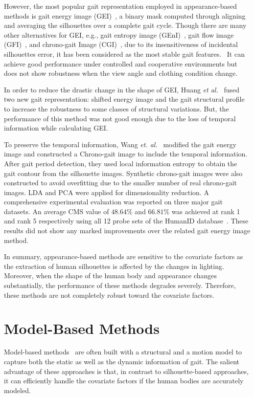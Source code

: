 However, the most popular gait representation employed in appearance-based methods is gait energy image (GEI)~\cite{Han_06}, a binary mask computed through aligning and averaging the silhouettes over a complete gait cycle. Though there are many other alternatives for GEI, e.g., gait entropy image (GEnI)~\cite{Bashir_09}, gait flow image (GFI)~\cite{Lam_11}, and chrono-gait Image (CGI)~\cite{Wang_12}, due to its insensitiveness of incidental silhouettes error, it has been considered as the most stable gait features.  It can achieve good performance under controlled and cooperative environments but does not show robustness when the view angle and clothing condition change. 

In order to reduce the drastic change in the shape of GEI, Huang \textit{et al.}~\cite{Huang_12} fused two new gait representation: shifted energy image and the gait structural profile to increase the robustness to some classes of structural variations. But, the performance of this method was not good enough due to the loss of temporal information while calculating GEI. 

To preserve the temporal information, Wang \textit{et. al.}~\cite{Wang_12} modified the gait energy image and constructed a Chrono-gait image to include the temporal information. After gait period detection, they used local information entropy to obtain the gait contour from the silhouette images. Synthetic chrono-gait images were also constructed to avoid overfitting due to the smaller number of real chrono-gait images. LDA and PCA were applied for dimensionality reduction. A comprehensive experimental evaluation was reported on three major gait datasets. An average CMS value of $ 48.64\% $ and $ 66.81\% $ was achieved at rank 1 and rank 5 respectively using all 12 probe sets of the HumanID database~\cite{Sarkar_05}. These results did not show any marked improvements over the related gait energy image method.


In summary, appearance-based methods are sensitive to the covariate factors as the extraction of human silhouettes is affected by the changes in lighting. Moreover, when the shape of the human body and appearance changes substantially, the performance of these methods degrades severely. Therefore, these methods are not completely robust toward the covariate factors.



\section{Model-Based Methods} \label{sec:model_based_methods}
Model-based methods~\cite{Yam_04, Gu_10, Wagg_04} are often built with a structural and a motion model to capture both the static as well as the dynamic information of gait. The salient advantage of these approaches is that, in contrast to silhouette-based approaches, it can efficiently handle the covariate factors if the human bodies are accurately modeled.


